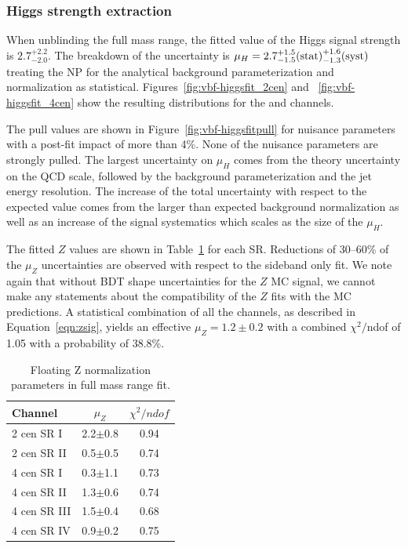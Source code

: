 \subsubsection{Higgs strength extraction}
\label{sec:vbf-higgsunblind}

When unblinding the full mass range, the fitted value of the Higgs signal strength is $2.7^{+2.2}_{-2.0}$. The breakdown of the uncertainty is $\mu_H=2.7^{+1.5}_{-1.5}\textnormal{(stat)}^{+1.6}_{-1.3}\textnormal{(syst)}$ treating the NP for the  analytical background parameterization and normalization as statistical. Figures~\ref{fig:vbf-higgsfit_2cen} and ~\ref{fig:vbf-higgsfit_4cen} show the resulting distributions for the \twocentral and \fourcentral channels. %

The pull values are shown in Figure~\ref{fig:vbf-higgsfitpull} for nuisance parameters with a post-fit impact of more than 4\%.  None of the nuisance parameters are strongly pulled. The largest uncertainty on $\mu_H$ comes from the theory uncertainty on the QCD scale, followed by the background parameterization and the jet energy resolution. The increase of the total uncertainty with respect to the expected value comes from the larger than expected background normalization as well as an increase of the signal systematics which scales as the size of the $\mu_H$. 

The fitted $Z$ values are shown in Table~\ref{tab:zfullfit} for each SR.  Reductions of 30--60\% of the $\mu_Z$ uncertainties are observed with respect to the sideband only fit.  We note again that without BDT shape uncertainties for the $Z$ MC signal, we cannot make any statements about the compatibility of the $Z$ fits with the MC predictions.  A statistical combination of all the channels, as described in Equation~\ref{eqn:zsig}, yields an effective $\mu_Z = 1.2 \pm 0.2$ with a combined $\chi^2/$ndof of 1.05 with a probability of 38.8\%.  

\begin{table}[htbp]
\centering
\caption{Floating Z normalization parameters in full mass range fit.}
\label{tab:zfullfit}
\begin{tabular}{|l|c|c|}
\hline
Channel      & $\mu_{Z}$   & $\chi^2/ndof$ \\ \hline
2 cen SR I   & 2.2$\pm$0.8  & 0.94      \\ \hline
2 cen SR II  & 0.5$\pm$0.5  & 0.74        \\ \hline
4 cen SR I   & 0.3$\pm$1.1  & 0.73         \\ \hline
4 cen SR II  & 1.3$\pm$0.6  & 0.74        \\ \hline
4 cen SR III & 1.5$\pm$0.4  & 0.68         \\ \hline
4 cen SR IV  & 0.9$\pm$0.2  & 0.75          \\ \hline
\end{tabular}
\end{table}


